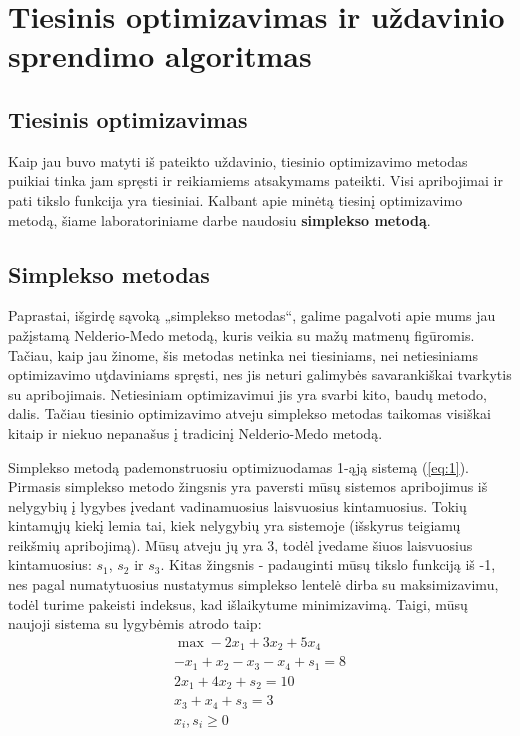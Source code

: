 \documentclass{article}
\begin{document}
\section{Tiesinis optimizavimas ir uždavinio sprendimo algoritmas}
\subsection{Tiesinis optimizavimas}
Kaip jau buvo matyti iš pateikto uždavinio, tiesinio optimizavimo metodas puikiai tinka jam spręsti ir reikiamiems atsakymams pateikti. Visi apribojimai ir pati tikslo funkcija yra tiesiniai. Kalbant apie minėtą tiesinį optimizavimo metodą, šiame laboratoriniame darbe naudosiu \textbf{simplekso metodą}.
\subsection{Simplekso metodas}
Paprastai, išgirdę sąvoką „simplekso metodas“, galime pagalvoti apie mums jau pažįstamą Nelderio-Medo metodą, kuris veikia su mažų matmenų figūromis. Tačiau, kaip jau žinome, šis metodas netinka nei tiesiniams, nei netiesiniams optimizavimo uţdaviniams spręsti, nes jis neturi galimybės savarankiškai tvarkytis su apribojimais. Netiesiniam optimizavimui jis yra svarbi kito, baudų metodo, dalis. Tačiau tiesinio optimizavimo atveju simplekso metodas taikomas visiškai kitaip ir niekuo nepanašus į tradicinį Nelderio-Medo metodą.

Simplekso metodą pademonstruosiu optimizuodamas 1-ąją sistemą (\ref{eq:1}). Pirmasis simplekso metodo žingsnis yra paversti mūsų sistemos apribojimus iš nelygybių į lygybes įvedant vadinamuosius laisvuosius kintamuosius. Tokių kintamųjų kiekį lemia tai, kiek nelygybių yra sistemoje (išskyrus teigiamų reikšmių apribojimą). Mūsų atveju jų yra 3, todėl įvedame šiuos laisvuosius kintamuosius: $s_1$, $s_2$ ir $s_3$. Kitas žingsnis - padauginti mūsų tikslo funkciją iš -1, nes pagal numatytuosius nustatymus simplekso lentelė dirba su maksimizavimu, todėl turime pakeisti indeksus, kad išlaikytume minimizavimą. Taigi, mūsų naujoji sistema su lygybėmis atrodo taip:
\begin{equation}
    \begin{split}
        \max -2x_{1}+3x_{2}+5x_{4} \\
        -x_{1}+x_{2}-x_{3}-x_{4}+s_1=8\\
        2x_{1}+4x_{2}+s_2=10\\
        x_{3}+x_{4}+s_3=3\\
        x_{i}, s_{i}\geq0
    \end{split}
\end{equation}
\end{document}
